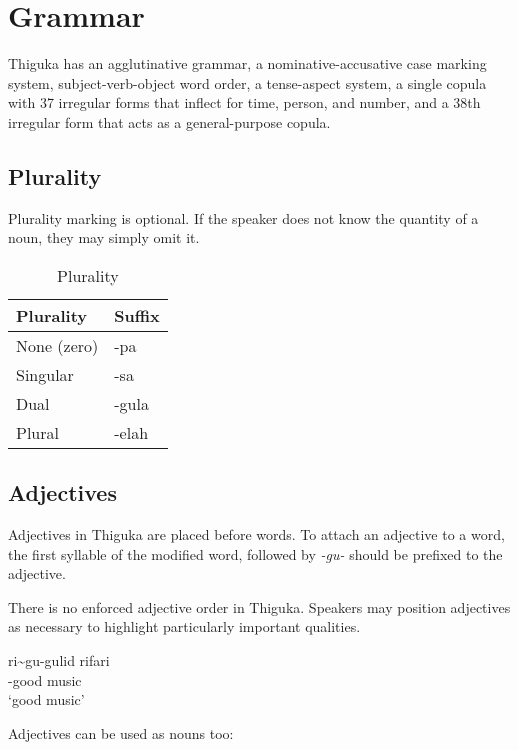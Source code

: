 
\newpage
\section{Grammar}
Thiguka has an agglutinative grammar, a nominative-accusative case marking system, subject-verb-object word order, a tense-aspect system, a single copula with 37 irregular forms that inflect for time, person, and number, and a 38th irregular form that acts as a general-purpose copula.

\subsection{Plurality}
Plurality marking is optional.
If the speaker does not know the quantity of a noun, they may simply omit it.

\begin{table}[h!]
    \centering
    \caption{Plurality}
    \begin{tabularx}{8cm}{|X|X|}
        \hline
        \textbf{Plurality} & \textbf{Suffix} \\
        \hline
        None (zero) & -pa \\
        Singular & -sa \\
        Dual & -gula \\
        Plural & -elah \\
        \hline
    \end{tabularx}
\end{table}



\subsection{Adjectives}
Adjectives in Thiguka are placed before words.
To attach an adjective to a word, the first syllable of the modified word, followed by \emph{-gu-} should be prefixed to the adjective.

There is no enforced adjective order in Thiguka. Speakers may position adjectives as necessary to highlight particularly important qualities.

\begin{exe}
    \ex{} \gll{}ri\~{}{}gu-gulid rifari\\
    \agradj{}-good music\\
    \glt{}`good music'
\end{exe}

Adjectives can be used as nouns too:

